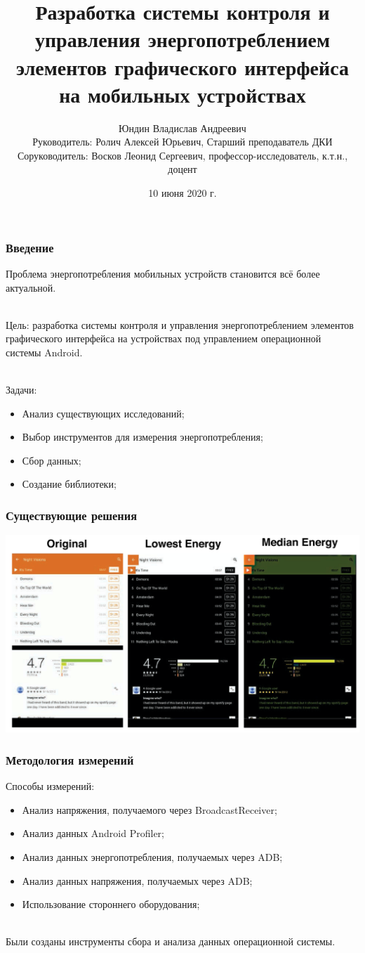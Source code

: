 \documentclass{beamer}
\title[Заголовок]{\large Разработка системы контроля и управления энергопотреблением элементов графического интерфейса на мобильных устройствах \vspace{-2ex}}
\author[Юндин Владислав]{\footnotesize Юндин Владислав Андреевич\\ \vspace{2ex} Руководитель: Ролич Алексей Юрьевич, Старший преподаватель ДКИ\\ Соруководитель: Восков Леонид Сергеевич, профессор-исследователь, к.т.н., доцент}
\institute[Высшая школа экономики]{НИУ ВШЭ, Информатика и вычислительная техника}
\date{10 июня 2020 г.}
\begin{document}
    \frame[plain]{\titlepage}
    
    \begin{frame}
    	\frametitle{Введение}
        Проблема энергопотребления мобильных устройств становится всё более актуальной.\\~

        Цель: разработка системы контроля и управления энергопотреблением элементов графического интерфейса на устройствах под управлением операционной системы Android.\\~

        Задачи:
        \begin{itemize}
            \item Анализ существующих исследований;
            \item Выбор инструментов для измерения энергопотребления;
            \item Сбор данных;
            \item Создание библиотеки;
        \end{itemize}

    \end{frame}
    \begin{frame}
        \frametitle{Существующие решения}
        \includegraphics[width=\linewidth]{AMOLED}
    \end{frame}
    \begin{frame}
        \frametitle{Методология измерений}
        Способы измерений:
        \begin{itemize}
            \item Анализ напряжения, получаемого через BroadcastReceiver;
            \item Анализ данных Android Profiler;
            \item Анализ данных энергопотребления, получаемых через ADB;
            \item Анализ данных напряжения, получаемых через ADB;
            \item Использование стороннего оборудования;
        \end{itemize}~\\
        Были созданы инструменты сбора и анализа данных операционной системы.
    \end{frame}
\end{document}
